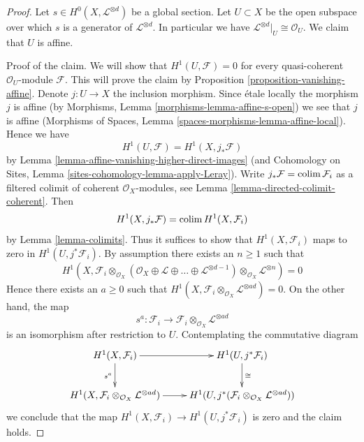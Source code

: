\begin{proof}
Let $s \in H^0(X, \mathcal{L}^{\otimes d})$ be a global section.
Let $U \subset X$ be the open subspace over which $s$ is a generator
of $\mathcal{L}^{\otimes d}$. In particular we have
$\mathcal{L}^{\otimes d}|_U \cong \mathcal{O}_U$.
We claim that $U$ is affine.

\medskip\noindent
Proof of the claim. We will show that $H^1(U, \mathcal{F}) = 0$
for every quasi-coherent $\mathcal{O}_U$-module $\mathcal{F}$.
This will prove the claim by Proposition \ref{proposition-vanishing-affine}.
Denote $j : U \to X$ the inclusion morphism.
Since \'etale locally the morphism $j$ is affine
(by Morphisms, Lemma \ref{morphisms-lemma-affine-s-open})
we see that $j$ is affine (Morphisms of Spaces, Lemma
\ref{spaces-morphisms-lemma-affine-local}).
Hence we have
$$
H^1(U, \mathcal{F}) = H^1(X, j_*\mathcal{F})
$$
by Lemma \ref{lemma-affine-vanishing-higher-direct-images}
(and Cohomology on Sites, Lemma \ref{sites-cohomology-lemma-apply-Leray}).
Write $j_*\mathcal{F} = \mathop{\mathrm{colim}}\nolimits \mathcal{F}_i$ as a filtered colimit
of coherent $\mathcal{O}_X$-modules, see
Lemma \ref{lemma-directed-colimit-coherent}. Then
$$
H^1(X, j_*\mathcal{F}) = \mathop{\mathrm{colim}}\nolimits H^1(X, \mathcal{F}_i)
$$
by Lemma \ref{lemma-colimits}.
Thus it suffices to show that $H^1(X, \mathcal{F}_i)$ maps
to zero in $H^1(U, j^*\mathcal{F}_i)$. By assumption there exists
an $n \geq 1$ such that
$$
H^1(X,
\mathcal{F}_i \otimes_{\mathcal{O}_X}
(\mathcal{O}_X \oplus \mathcal{L} \oplus \ldots
\oplus \mathcal{L}^{\otimes d - 1})
\otimes_{\mathcal{O}_X} \mathcal{L}^{\otimes n}) = 0
$$
Hence there exists an $a \geq 0$ such that
$H^1(X, \mathcal{F}_i \otimes_{\mathcal{O}_X} \mathcal{L}^{\otimes ad}) = 0$.
On the other hand, the map
$$
s^a : \mathcal{F}_i \longrightarrow
\mathcal{F}_i \otimes_{\mathcal{O}_X} \mathcal{L}^{\otimes ad}
$$
is an isomorphism after restriction to $U$. Contemplating the
commutative diagram
$$
\xymatrix{
H^1(X, \mathcal{F}_i) \ar[r] \ar[d]_{s^a} & H^1(U, j^*\mathcal{F}_i)
\ar[d]^{\cong} \\
H^1(X, \mathcal{F}_i \otimes_{\mathcal{O}_X} \mathcal{L}^{\otimes ad}) \ar[r] &
H^1(U,
j^*(\mathcal{F}_i \otimes_{\mathcal{O}_X} \mathcal{L}^{\otimes ad}))
}
$$
we conclude that the map  $H^1(X, \mathcal{F}_i) \to H^1(U, j^*\mathcal{F}_i)$
is zero and the claim holds.


\end{proof}
